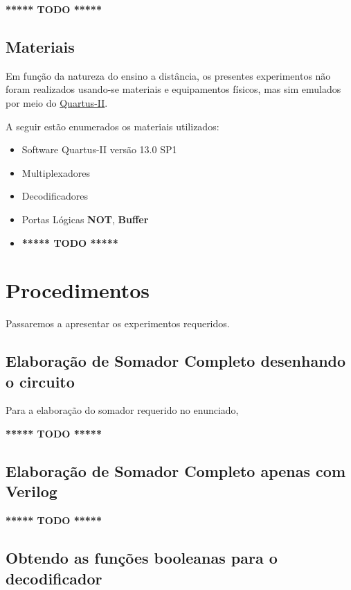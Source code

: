 \documentclass[12pt]{article}
\begin{document}
\textbf{***** TODO *****}

\subsection{Materiais}
\label{sec:Materiais}
Em função da natureza do ensino a distância, os presentes experimentos não foram
realizados usando-se materiais e equipamentos físicos, mas sim emulados por meio
do
\href{https://www.intel.com/content/www/us/en/software/programmable/quartus-prime/download.html}{Quartus-II}.

A seguir estão enumerados os materiais utilizados:
\begin{itemize}
    \item Software Quartus-II versão 13.0 SP1
    \item Multiplexadores
    \item Decodificadores
    \item Portas Lógicas \textbf{NOT}, \textbf{Buffer}
    \item \textbf{***** TODO *****}
\end{itemize}

\section{Procedimentos}
\label{sec:Procedimentos}

Passaremos a apresentar os experimentos requeridos.

\subsection{Elaboração de Somador Completo desenhando o circuito}\label{sec:2.1}

Para a elaboração do somador requerido no enunciado,

\textbf{***** TODO *****}

\subsection{Elaboração de Somador Completo apenas com Verilog}\label{sec:2.2}

\textbf{***** TODO *****}

\subsection{Obtendo as funções booleanas para o decodificador}\label{sec:2.3}
\end{document}
